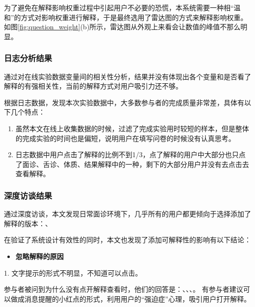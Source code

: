 为了避免在解释影响权重过程中引起用户不必要的恐慌，本系统需要一种相``温和''的方式对影响权重进行解释，于是最终选用了雷达图的方式来解释影响权重。
如图\ref{fig:question_weight}(b)所示，雷达图从外观上来看会让数值的峰值不那么明显。

\subsubsection{日志分析结果}

通过对在线实验数据变量间的相关性分析，结果并没有体现出各个变量和是否看了解释的有强相关性，当前的解释方式对用户吸引力还不够。

根据日志数据，发现本次实验数据中，大多数参与者的完成质量非常差，具体有以下几个特点：
\begin{enumerate}
    \item 虽然本文在线上收集数据的时候，过滤了完成实验用时较短的样本，但是整体的完成实验的时间也是偏短，说明用户在填写问卷的时候没有认真思考。

    \item 日志数据中用户点击了解释的比例不到1/3，点了解释的用户中大部分也只点了面诊、舌诊、体质、结果解释中的一种，剩下的大部分用户并没有去点击去查看解释。
\end{enumerate}

\subsubsection{深度访谈结果}

通过深度访谈，本文发现日常面诊环境下，几乎所有的用户都更倾向于选择添加了解释的版本：、

在验证了系统设计有效性的同时，本文也发现了添加可解释性的影响有以下结论：

\begin{itemize}
\item \textbf{忽略解释的原因}
\end{itemize}

1. 文字提示的形式不明显，不知道可以点击。

参与者被问到为什么没有点开解释查看时，他们的回答是：、、、。
有参与者建议可以做成消息提醒的小红点的形式，利用用户的“强迫症”心理，吸引用户打开解释。

